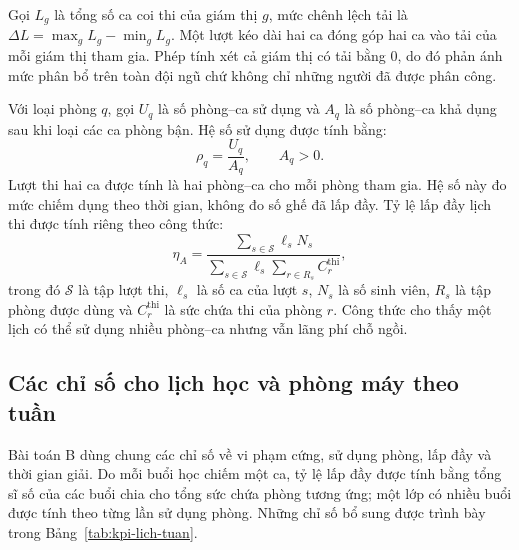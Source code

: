 Gọi $L_g$ là tổng số ca coi thi của giám thị $g$, mức chênh lệch tải là $\Delta L=\max_g L_g-\min_g L_g$. Một lượt kéo dài hai ca đóng góp hai ca vào tải của mỗi giám thị tham gia. Phép tính xét cả giám thị có tải bằng 0, do đó phản ánh mức phân bổ trên toàn đội ngũ chứ không chỉ những người đã được phân công.

Với loại phòng $q$, gọi $U_q$ là số phòng--ca sử dụng và $A_q$ là số phòng--ca khả dụng sau khi loại các ca phòng bận. Hệ số sử dụng được tính bằng:
\begin{equation}
    \rho_q = \frac{U_q}{A_q}, \qquad A_q>0.
    \label{eq:kpi-su-dung-phong}
\end{equation}
Lượt thi hai ca được tính là hai phòng--ca cho mỗi phòng tham gia. Hệ số này đo mức chiếm dụng theo thời gian, không đo số ghế đã lấp đầy. Tỷ lệ lấp đầy lịch thi được tính riêng theo công thức:
\begin{equation}
    \eta_A =
    \frac{\sum_{s\in\mathcal{S}} \ell_s N_s}
         {\sum_{s\in\mathcal{S}} \ell_s\sum_{r\in R_s} C_r^{\mathrm{thi}}},
    \label{eq:kpi-lap-day-thi}
\end{equation}
trong đó $\mathcal{S}$ là tập lượt thi, $\ell_s$ là số ca của lượt $s$, $N_s$ là số sinh viên, $R_s$ là tập phòng được dùng và $C_r^{\mathrm{thi}}$ là sức chứa thi của phòng $r$. Công thức cho thấy một lịch có thể sử dụng nhiều phòng--ca nhưng vẫn lãng phí chỗ ngồi.

\subsection{Các chỉ số cho lịch học và phòng máy theo tuần}

Bài toán B dùng chung các chỉ số về vi phạm cứng, sử dụng phòng, lấp đầy và thời gian giải. Do mỗi buổi học chiếm một ca, tỷ lệ lấp đầy được tính bằng tổng sĩ số của các buổi chia cho tổng sức chứa phòng tương ứng; một lớp có nhiều buổi được tính theo từng lần sử dụng phòng. Những chỉ số bổ sung được trình bày trong Bảng~\ref{tab:kpi-lich-tuan}.

